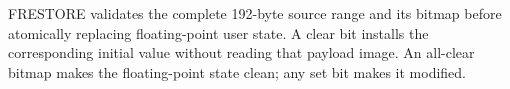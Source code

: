 FRESTORE validates the complete 192-byte source range and its bitmap before atomically replacing floating-point user state. A clear bit installs the corresponding initial value without reading that payload image. An all-clear bitmap makes the floating-point state clean; any set bit makes it modified.
